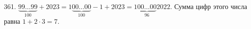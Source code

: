 361. $\underbrace{99\ldots99}_{100}+2023=1\underbrace{00\ldots00}_{100}-1+2023=1\underbrace{00\ldots00}_{96}2022.$ Сумма цифр этого числа равна $1+2\cdot3=7.$\\
